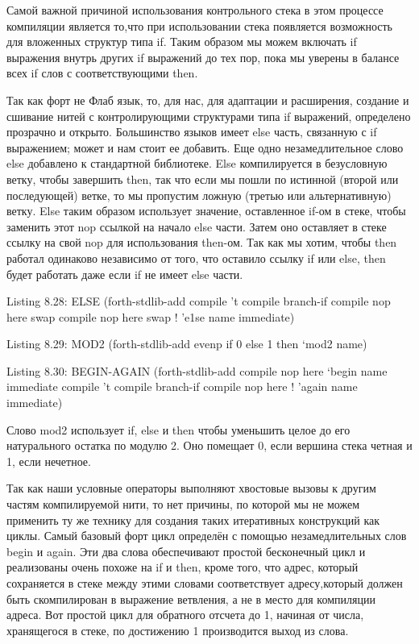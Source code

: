 {{{Самой важной причиной использования контрольного стека в этом процессе компиляции является то,что при использовании стека появляется возможность для вложенных структур типа if. Таким образом мы можем включать if выражения внутрь других if выражений до тех пор, пока мы уверены в балансе всех if слов с соответствующими then.

Так как форт не Флаб язык, то, для нас, для адаптации и расширения, создание и сшивание нитей с контролирующими структурами типа if выражений, определено прозрачно и открыто. Большинство языков имеет else часть, связанную с if выражением; может и нам стоит ее добавить. Еще одно незамедлительное слово else добавлено к стандартной библиотеке. Else компилируется в безусловную ветку, чтобы завершить then, так что если мы пошли по истинной (второй или последующей) ветке, то мы пропустим ложную (третью или альтернативную) ветку. Else таким образом использует значение, оставленное if-ом в стеке, чтобы заменить этот nop ссылкой на начало else части. Затем оно оставляет в стеке ссылку на свой nop для использования then-ом. Так как мы хотим, чтобы then работал одинаково независимо от того, что оставило ссылку if или else, then будет работать даже если if не имеет else части.

Listing 8.28: ELSE
(forth-stdlib-add
{ compile ’t
compile branch-if
compile nop
here swap
compile nop
here swap ! } ’e1se name immediate)

Listing 8.29: MOD2
(forth-stdlib-add
{ evenp if 0 else 1 then } ‘mod2 name)

Listing 8.30: BEGIN-AGAIN
(forth-stdlib-add
{ compile nop
here } ‘begin name immediate
{ compile ’t
compile branch-if
compile nop
here ! } ’again name immediate)

Слово mod2 использует if, else и then чтобы уменьшить целое до его натурального остатка по модулю 2. Оно помещает 0, если вершина стека четная и 1, если нечетное.

Так как наши условные операторы  выполняют хвостовые вызовы к другим частям компилируемой нити, то нет причины, по которой мы не можем применить ту же технику для создания таких итеративных конструкций как циклы. Самый базовый форт цикл определён с помощью незамедлительных слов begin и again. Эти два слова обеспечивают простой бесконечный цикл и реализованы очень похоже на if и then, кроме того, что адрес, который сохраняется в стеке между этими словами соответствует адресу,который должен быть скомпилирован в выражение ветвления, а не в место для компиляции адреса. Вот простой цикл для обратного отсчета до 1, начиная от числа, хранящегося в стеке, по достижению 1 производится выход из слова.

}}}
